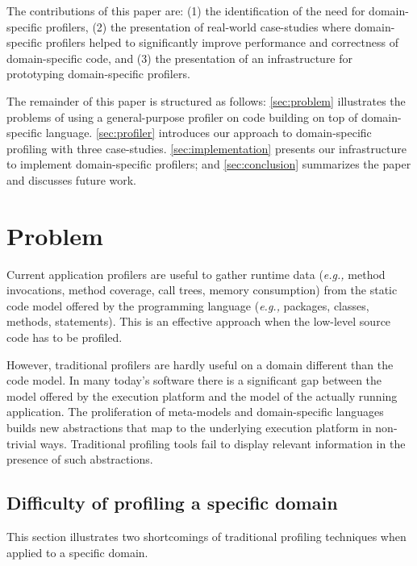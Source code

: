 \documentclass[runningheads]{llncs}
\newcommand{\ugh}[1]{\textcolor{red}{\uwave{#1}}} %
\newcommand{\eg}{\emph{e.g.,}\xspace}
\newcommand{\seclabel}[1]{\label{sec:#1}}
\begin{document}
The contributions of this paper are: (1) the identification of the need for domain-specific profilers, (2) the presentation of \ugh{several} real-world case-studies where domain-specific profilers helped to significantly improve performance and correctness of domain-specific code, and (3) the presentation of an infrastructure for prototyping domain-specific profilers.

The remainder of this paper is structured as follows: \autoref{sec:problem} illustrates the problems of using a general-purpose profiler on code building on top of domain-specific language. \autoref{sec:profiler} introduces our approach to domain-specific profiling with three case-studies. \autoref{sec:implementation} presents our infrastructure to implement domain-specific profilers; and \autoref{sec:conclusion} summarizes the paper and discusses future work.

\section{Problem}\seclabel{problem}

Current application profilers are useful to gather runtime data (\eg method invocations, method coverage, call trees, memory consumption) from the static code model offered by the programming language (\eg packages, classes, methods, statements). This is an effective approach when the low-level source code has to be profiled.

However, traditional profilers are hardly useful on a domain different than the code model. In many today's software there is a significant gap between the model offered by the execution platform and the model of the actually running application. The proliferation of meta-models and domain-specific languages builds new abstractions that map to the underlying execution platform in non-trivial ways. Traditional profiling tools fail to display relevant information in the presence of such abstractions.


\subsection{Difficulty of profiling a specific domain} \label{mondrian}

This section illustrates two shortcomings of traditional profiling techniques when applied to a specific domain.\\
\end{document}
